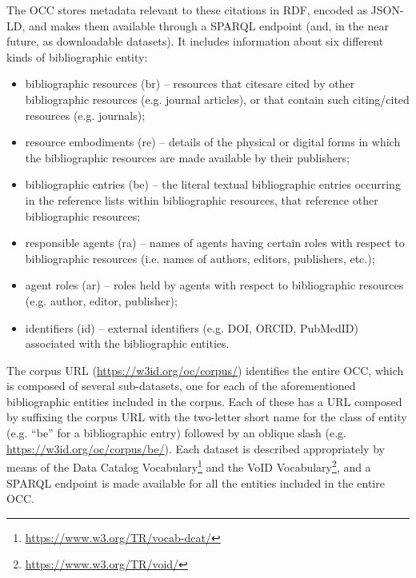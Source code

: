 \documentclass[runningheads,a4paper]{llncs}
\begin{document}
The OCC stores metadata relevant to these citations in RDF, encoded as JSON-LD, and makes them available through a SPARQL endpoint (and, in the near future, as downloadable datasets). It includes information about six different kinds of bibliographic entity:
\begin{itemize}
\item bibliographic resources (br) -- resources that citesare cited by other bibliographic resources (e.g. journal articles), or that contain such citing/cited resources (e.g. journals);
\item resource embodiments (re) -- details of the physical or digital forms in which the bibliographic resources are made available by their publishers;
\item bibliographic entries (be) -- the literal textual bibliographic entries occurring in the reference lists within bibliographic resources, that reference other bibliographic resources;
\item responsible agents (ra) -- names of agents having certain roles with respect to bibliographic resources (i.e. names of authors, editors, publishers, etc.);
\item agent roles (ar) -- roles held by agents with respect to bibliographic resources (e.g. author, editor, publisher);
\item identifiers (id) -- external identifiers (e.g. DOI, ORCID, PubMedID) associated with the bibliographic entities.
\end{itemize}

The corpus URL (\url{https://w3id.org/oc/corpus/}) identifies the entire OCC, which is composed of several sub-datasets, one for each of the aforementioned bibliographic entities included in the corpus. Each of these has a URL composed by suffixing the corpus URL with the two-letter short name for the class of entity (e.g. ``be'' for a bibliographic entry) followed by an oblique slash (e.g. \url{https://w3id.org/oc/corpus/be/}). Each dataset is described appropriately by means of the Data Catalog Vocabulary\footnote{\url{https://www.w3.org/TR/vocab-dcat/}} and the VoID Vocabulary\footnote{\url{https://www.w3.org/TR/void/}}, and a SPARQL endpoint is made available for all the entities included in the entire OCC.
\end{document}

